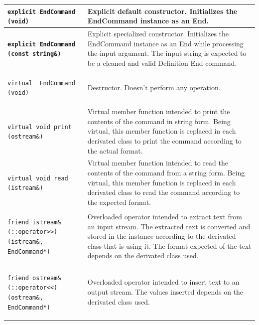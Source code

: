 \documentclass[11pt,twoside,openany,x11names,svgnames]{memoir}
\begin{document}
\begin{table}[h]\footnotesize
\centering
\begin{tabular}{| >{\bfseries}p{8.5cm} | p{7cm} |}
	\hline
	
	\texttt{explicit EndCommand (void)} & Explicit default constructor. Initializes the EndCommand instance as an End. \\
	
	\hline
	
	\texttt{explicit EndCommand (const string\&)} & Explicit specialized constructor. Initializes the EndCommand instance as an End while processing the input argument. The input string is expected to be a cleaned and valid Definition End command. \\
	
	\hline
	
	\texttt{virtual ~EndCommand (void)} & Destructor. Doesn't perform any operation. \\
	
	\hline
	
	\texttt{virtual void print (ostream\&)} & Virtual member function intended to print the contents of the command in string form. Being virtual, this member function is replaced in each derivated class to print the command according to the actual format. \\
	
	\hline
	
	\texttt{virtual void read (istream\&)} & Virtual member function intended to read the contents of the command from a string form. Being virtual, this member function is replaced in each derivated class to read the command according to the expected format. \\
	
	\hline	
		
	\texttt{friend istream\& (::operator>>) (istream\&, EndCommand*)} & Overloaded operator intended to extract text from an input stream. The extracted text is converted and stored in the instance according to the derivated class that is using it. The format expected of the text depends on the derivated class used. \\
	
	\hline
	
	\texttt{friend ostream\& (::operator<<) (ostream\&, EndCommand*)} & Overloaded operator intended to insert text to an output stream. The values inserted depends on the derivated class used. \\
	
	\hline
	

\end{tabular}
\end{table}
\end{document}
